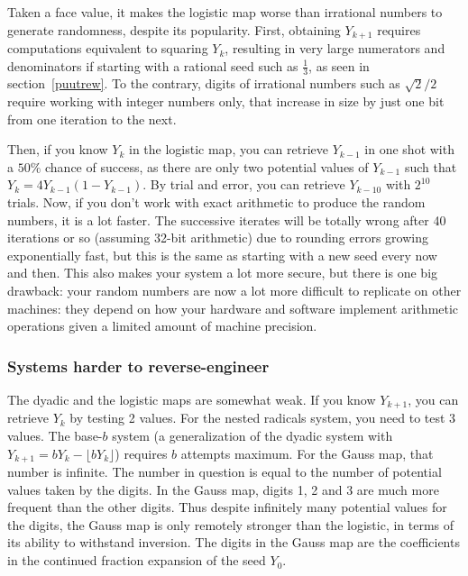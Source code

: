 \documentclass[oneside,10pt]{book}
\begin{document}
Taken a face value, it makes the logistic map worse than irrational numbers to generate randomness, despite its popularity.
First, obtaining $Y_{k+1}$ requires computations equivalent to squaring $Y_k$, resulting in very large numerators and denominators if starting with a rational seed such as $\frac{1}{3}$, as seen in section~\ref{puutrew}. To the contrary, digits of irrational numbers such as
 $\sqrt{2}/2$ require working with integer numbers only, that increase in size by just one bit from one iteration to the next.

Then, if you know $Y_{k}$ in the logistic map, you can retrieve $Y_{k-1}$ in one shot with a $50\%$ chance of success, as there are only two potential values of $Y_{k-1}$ such that
 $Y_{k}=4Y_{k-1}(1-Y_{k-1})$. By trial and error, you can retrieve $Y_{k-10}$ with $2^{10}$ trials. Now, if you don't work with exact
 arithmetic to produce the random numbers, it is a lot faster. The successive iterates will be totally wrong after 40 iterations or so (assuming 32-bit arithmetic) due
 to rounding errors growing exponentially fast, but this is the same as starting with a new seed every now and then. This also makes your system a lot more secure, but there is one big drawback:
  your random numbers are now a lot more difficult to replicate on other machines: they depend on how your hardware and software implement arithmetic operations given a limited amount of machine precision.

\subsubsection{Systems harder to reverse-engineer}

The dyadic and the logistic maps are somewhat weak. If you know $Y_{k+1}$, you can retrieve $Y_k$ by testing 2 values. For the \textcolor{index}{nested radicals} system, you need to test 3 values.  The base-$b$ system (a generalization of the dyadic system with $Y_{k+1}=bY_k - \lfloor bY_k\rfloor$) requires $b$ attempts maximum.  For the
 \textcolor{index}{Gauss map}, that number is infinite. The number in question is equal to the number of potential
values taken by the digits. In the Gauss map, digits 1, 2 and 3 are much more frequent than the other digits. Thus despite
 infinitely many potential values for the digits, the Gauss map is only remotely stronger than the logistic, in terms of its ability to withstand inversion. The digits in the Gauss map are the coefficients in the continued fraction expansion of the seed $Y_0$.
\end{document}

